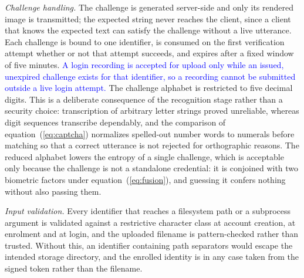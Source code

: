 \documentclass[10pt,journal,compsoc]{IEEEtran}
\begin{document}
{\emph{Challenge handling.} The challenge is generated server-side and only its rendered image is transmitted; the expected string never reaches the client, since a client that knows the expected text can satisfy the challenge without a live utterance. Each challenge is bound to one identifier, is consumed on the first verification attempt whether or not that attempt succeeds, and expires after a fixed window of five minutes. \textcolor{blue}{A login recording is accepted for upload only while an issued, unexpired challenge exists for that identifier, so a recording cannot be submitted outside a live login attempt.} The challenge alphabet is restricted to five decimal digits. This is a deliberate consequence of the recognition stage rather than a security choice: transcription of arbitrary letter strings proved unreliable, whereas digit sequences transcribe dependably, and the comparison of equation~(\ref{eq:captcha}) normalizes spelled-out number words to numerals before matching so that a correct utterance is not rejected for orthographic reasons. The reduced alphabet lowers the entropy of a single challenge, which is acceptable only because the challenge is not a standalone credential: it is conjoined with two biometric factors under equation~(\ref{eq:fusion}), and guessing it confers nothing without also passing them.

\emph{Input validation.} Every identifier that reaches a filesystem path or a subprocess argument is validated against a restrictive character class at account creation, at enrolment and at login, and the uploaded filename is pattern-checked rather than trusted. Without this, an identifier containing path separators would escape the intended storage directory, and the enrolled identity is in any case taken from the signed token rather than the filename.
}
\end{document}
